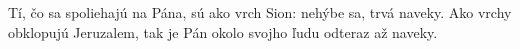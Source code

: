 Tí, čo sa spoliehajú na Pána, sú ako vrch Sion:
nehýbe sa, trvá naveky.
\versseparator
Ako vrchy obklopujú Jeruzalem,
tak je Pán okolo svojho ľudu
odteraz až naveky.